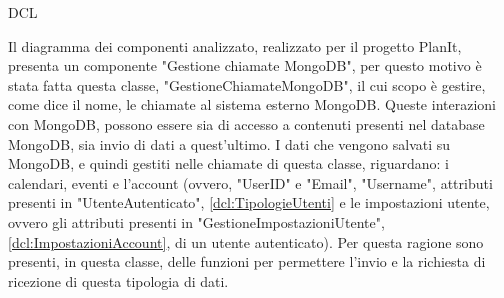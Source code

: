 \begin{listaPersonale}{DCL}
    \begin{center}
        
    \end{center}



    Il diagramma dei componenti analizzato, realizzato per il progetto PlanIt, presenta un componente "Gestione chiamate MongoDB", per questo motivo è stata fatta questa classe, "GestioneChiamateMongoDB", il cui scopo è gestire, come dice il nome, le chiamate al sistema esterno MongoDB. Queste interazioni con MongoDB, possono essere sia di accesso a contenuti presenti nel database MongoDB, sia invio di dati a quest'ultimo. I dati che vengono salvati su MongoDB, e quindi gestiti nelle chiamate di questa classe, riguardano: i calendari, eventi e l'account (ovvero, "UserID" e "Email", "Username", attributi presenti in "UtenteAutenticato", \ref{dcl:TipologieUtenti} e le impostazioni utente, ovvero gli attributi presenti in "GestioneImpostazioniUtente", \ref{dcl:ImpostazioniAccount}, di un utente autenticato). Per questa ragione sono presenti, in questa classe, delle funzioni per permettere l'invio e la richiesta di ricezione di questa tipologia di dati.


    \begin{center}
        
    \end{center}



\end{listaPersonale}
